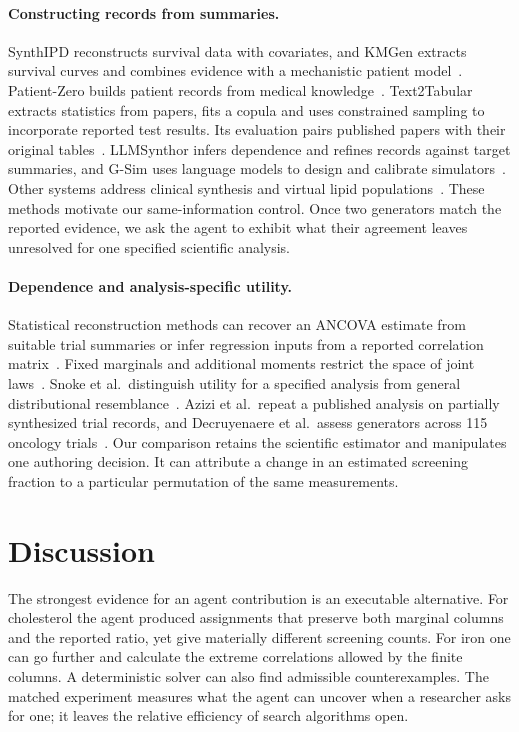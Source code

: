 \documentclass[sigconf,anonymous,review]{acmart}
\begin{document}
\paragraph{Constructing records from summaries.}
SynthIPD reconstructs survival data with covariates, and KMGen extracts survival curves and combines evidence with a mechanistic patient model~\cite{synthipd,kmgen}. Patient-Zero builds patient records from medical knowledge~\cite{patientzero}. Text2Tabular extracts statistics from papers, fits a copula and uses constrained sampling to incorporate reported test results. Its evaluation pairs published papers with their original tables~\cite{gottal2026text2tabular}. LLMSynthor infers dependence and refines records against target summaries, and G-Sim uses language models to design and calibrate simulators~\cite{llmsynthor,gsim}. Other systems address clinical synthesis and virtual lipid populations~\cite{synthcraft,allenlipid,fasseeh}. These methods motivate our same-information control. Once two generators match the reported evidence, we ask the agent to exhibit what their agreement leaves unresolved for one specified scientific analysis.

\paragraph{Dependence and analysis-specific utility.}
Statistical reconstruction methods can recover an ANCOVA estimate from suitable trial summaries or infer regression inputs from a reported correlation matrix~\cite{pseudoancova,bonofiglio}. Fixed marginals and additional moments restrict the space of joint laws~\cite{bounds,makarov,zaev}. Snoke et al.\ distinguish utility for a specified analysis from general distributional resemblance~\cite{specificutility}. Azizi et al.\ repeat a published analysis on partially synthesized trial records, and Decruyenaere et al.\ assess generators across 115 oncology trials~\cite{azizi,oncology115}. Our comparison retains the scientific estimator and manipulates one authoring decision. It can attribute a change in an estimated screening fraction to a particular permutation of the same measurements.

\section{Discussion}
The strongest evidence for an agent contribution is an executable alternative. For cholesterol the agent produced assignments that preserve both marginal columns and the reported ratio, yet give materially different screening counts. For iron one can go further and calculate the extreme correlations allowed by the finite columns. A deterministic solver can also find admissible counterexamples. The matched experiment measures what the agent can uncover when a researcher asks for one; it leaves the relative efficiency of search algorithms open.
\end{document}
